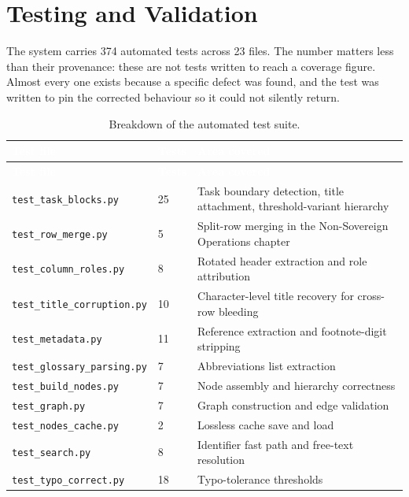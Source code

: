 \section{Testing and Validation}

The system carries 374 automated tests across 23 files. The number matters less than their provenance: these are not tests written to reach a coverage figure. Almost every one exists because a specific defect was found, and the test was written to pin the corrected behaviour so it could not silently return.

\begin{longtable}{|p{}|p{}|p{}|}
\caption{Breakdown of the automated test suite.}\label{tab:tests}\\
\hline
\rowcolor{thesisgreen}\textcolor{white}{\textbf{Test file}} & \textcolor{white}{\textbf{Tests}} & \textcolor{white}{\textbf{Area covered}} \\
\hline
\endfirsthead
\hline
\rowcolor{thesisgreen}\textcolor{white}{\textbf{Test file}} & \textcolor{white}{\textbf{Tests}} & \textcolor{white}{\textbf{Area covered}} \\
\hline
\endhead
\texttt{test\_task\_blocks.py} & 25 & Task boundary detection, title attachment, threshold-variant hierarchy \\ \hline
\texttt{test\_row\_merge.py} & 5 & Split-row merging in the Non-Sovereign Operations chapter \\ \hline
\texttt{test\_column\_roles.py} & 8 & Rotated header extraction and role attribution \\ \hline
\texttt{test\_title\_corruption.py} & 10 & Character-level title recovery for cross-row bleeding \\ \hline
\texttt{test\_metadata.py} & 11 & Reference extraction and footnote-digit stripping \\ \hline
\texttt{test\_glossary\_parsing.py} & 7 & Abbreviations list extraction \\ \hline
\texttt{test\_build\_nodes.py} & 7 & Node assembly and hierarchy correctness \\ \hline
\texttt{test\_graph.py} & 7 & Graph construction and edge validation \\ \hline
\texttt{test\_nodes\_cache.py} & 2 & Lossless cache save and load \\ \hline
\texttt{test\_search.py} & 8 & Identifier fast path and free-text resolution \\ \hline
\texttt{test\_typo\_correct.py} & 18 & Typo-tolerance thresholds \\ \hline

\end{longtable}
